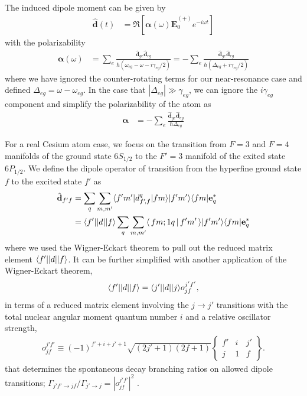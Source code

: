 The induced dipole moment can be given by
\begin{align}
\hat{\mathbf{d}}(t) 
&= \Re\left[ \boldsymbol{\alpha}(\omega)\hat{\mathbf{E}}_0^{(+)} e^{-i\omega t}\right]
\end{align}
with the polarizability 
\begin{align}\label{Eq::PTensorGen}
\boldsymbol{\alpha}(\omega) &=\sum_e \frac{\hat{\mathbf{d}}_{ge}\hat{\mathbf{d}}_{eg}}{\hbar(\omega_{eg} -\omega -i\gamma_{eg}/2)} =-\sum_e \frac{\hat{\mathbf{d}}_{ge}\hat{\mathbf{d}}_{eg}}{\hbar(\Delta_{eg} +i\gamma_{eg}/2)}
\end{align}
where we have ignored the counter-rotating terms for our near-resonance case and defined $ \Delta_{eg}=\omega-\omega_{eg} $. In the case that $ |\Delta_{eg} |\gg \gamma_{eg} $, we can ignore the $ i\gamma_{eg} $ component and simplify the polarizability of the atom as
\begin{align}
\boldsymbol{\alpha} &= -\sum_e \frac{\hat{\mathbf{d}}_{ge}\hat{\mathbf{d}}_{eg}}{\hbar\Delta_{eg}} 
\end{align} 

For a real Cesium atom case, we focus on the transition from $ F=3 $ and $ F=4 $ manifolds of the ground state $ 6S_{1/2} $ to the $ F'=3 $ manifold of the exited state $ 6P_{1/2} $. We define the dipole operator of transition from the hyperfine ground state $ f $ to the excited state $ f' $ as~\cite{Baragiola2014a}
\begin{align}
\hat{\mathbf{d}}_{f'f} &=  \sum_q \sum_{m, m'}  \langle{f' m'}\rvert d_{f'\!,f}^q \lvert{f m}\rangle \lvert{f' m'}\rangle\langle{f m}\rvert \mathbf{e}_q^* \\
& = \langle{ f' }\rvert| d | \lvert{ f }\rangle \sum_q \sum_{m, m'}  \langle\, f m; 1 q\,\vert\, f' m' \,\rangle \lvert{f' m'}\rangle\langle{f m}\rvert \mathbf{e}_q^*
\end{align}
where we used the Wigner-Eckart theorem to pull out the reduced matrix element $\langle{ f' }\rvert| d | \lvert{ f }\rangle $.  It can be further simplified with another application of the Wigner-Eckart theorem,
	\begin{align}
		\langle{ f' }\rvert| d | \lvert{ f }\rangle = \langle{ j' }\rvert| d | \lvert{ j }\rangle o^{j' f'}_{j f},
	\end{align}
in terms of a reduced matrix element involving the $j \rightarrow j'$ transitions with the total nuclear angular moment quantum number $ i $ and a relative oscillator strength,
	\begin{align} \label{Eq::OscStrength}
		o^{j' f'}_{j f} \equiv (-1)^{f'+i + j' + 1} \sqrt{ (2 j'+1) (2f + 1) } 
			\left\{ 
				\begin{array}{ccc}
					f' & i & j' \\
					j & 1 & f
				\end{array}
			\right\} .
	\end{align}
that determines the spontaneous decay branching ratios on allowed dipole transitions; $\Gamma_{j' f' \rightarrow j f} / \Gamma_{j'\rightarrow j} = |o^{j' f'}_{j f}|^2$ \cite{Deutsch2010a}.	
	
